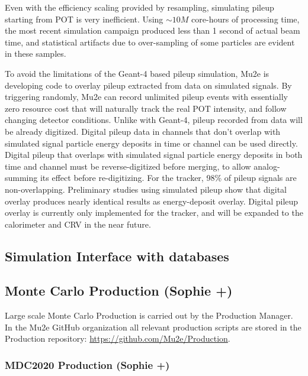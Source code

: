 Even with the efficiency scaling provided by resampling, simulating pileup starting from POT is very inefficient.  Using $\sim 10M$ core-hours of processing time, the most recent simulation campaign produced less than 1 second of actual beam time, and statistical artifacts due to over-sampling of some particles are evident in these samples.

To avoid the limitations of the Geant-4 based pileup simulation, Mu2e is developing code to overlay pileup extracted from data on simulated signals. By triggering randomly, Mu2e can record unlimited pileup events with essentially zero resource cost that will naturally track the real POT intensity, and follow changing detector conditions. Unlike with Geant-4, pileup recorded from data will be already digitized. Digital pileup data in channels that don't overlap with simulated signal particle energy deposits in time or channel can be used directly. 
Digital pileup that overlaps with simulated signal particle energy deposits in both time and channel must be reverse-digitized before merging, to allow analog-summing its effect before re-digitizing. For the tracker, 98\% of pileup signals are non-overlapping. Preliminary studies using simulated pileup show that digital overlay produces nearly identical results as energy-deposit overlay. Digital pileup overlay is currently only implemented for the tracker, and will be expanded to the calorimeter and CRV in the near future.

\subsection{ Simulation Interface with databases}



\subsection{Monte Carlo Production (Sophie +)}

Large scale Monte Carlo Production is carried out by the Production Manager. In the Mu2e GitHub organization all relevant production scripts are stored in the Production repository: \url{https://github.com/Mu2e/Production}.

\subsubsection{MDC2020 Production (Sophie +)}

